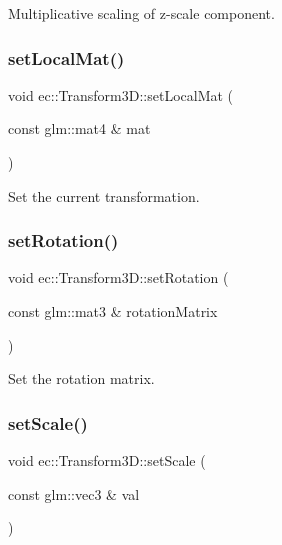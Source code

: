Multiplicative scaling of z-\/scale component. \mbox{\label{classec_1_1_transform3_d_a5cc1409f0c09910a701dcd294e797498}} 
\subsubsection{\texorpdfstring{set\+Local\+Mat()}{setLocalMat()}}
{\footnotesize\ttfamily void ec\+::\+Transform3\+D\+::set\+Local\+Mat (\begin{DoxyParamCaption}\item[{const glm\+::mat4 \&}]{mat }\end{DoxyParamCaption})}

Set the current transformation. \mbox{\label{classec_1_1_transform3_d_adc80d3f045c44c02bec2f2c1db2144db}} 
\subsubsection{\texorpdfstring{set\+Rotation()}{setRotation()}}
{\footnotesize\ttfamily void ec\+::\+Transform3\+D\+::set\+Rotation (\begin{DoxyParamCaption}\item[{const glm\+::mat3 \&}]{rotation\+Matrix }\end{DoxyParamCaption})}

Set the rotation matrix. \mbox{\label{classec_1_1_transform3_d_af8c2d1832acc0b0b52e217de4efa4d91}} 
\subsubsection{\texorpdfstring{set\+Scale()}{setScale()}\hspace{0.1cm}{\footnotesize\ttfamily [1/3]}}
{\footnotesize\ttfamily void ec\+::\+Transform3\+D\+::set\+Scale (\begin{DoxyParamCaption}\item[{const glm\+::vec3 \&}]{val }\end{DoxyParamCaption})}

